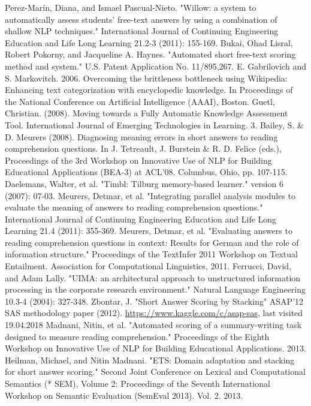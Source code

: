 \documentclass[rnd]{mas_report}
\begin{document}
\begin{thebibliography}{3}
 Perez-Marín, Diana, and Ismael Pascual-Nieto. "Willow: a system to automatically assess students’ free-text answers by using a combination of shallow NLP techniques." International Journal of Continuing Engineering Education and Life Long Learning 21.2-3 (2011): 155-169.
 Bukai, Ohad Lisral, Robert Pokorny, and Jacqueline A. Haynes. "Automated short free-text scoring method and system." U.S. Patent Application No. 11/895,267.
 E. Gabrilovich and S. Markovitch. 2006. Overcoming the brittleness bottleneck using Wikipedia: Enhancing text categorization with encyclopedic knowledge. In Proceedings of the National Conference on Artificial Intelligence (AAAI), Boston.
 Guetl, Christian. (2008). Moving towards a Fully Automatic Knowledge Assessment Tool. International Journal of Emerging Technologies in Learning. 3. 
 Bailey, S. \& D. Meurers (2008). Diagnosing meaning errors in short answers to reading comprehension questions. In J. Tetreault, J. Burstein \& R. D. Felice (eds.), Proceedings of the 3rd Workshop on Innovative Use of NLP for Building Educational Applications (BEA-3) at ACL'08. Columbus, Ohio, pp. 107-115.
 Daelemans, Walter, et al. "Timbl: Tilburg memory-based learner." version 6 (2007): 07-03.
 Meurers, Detmar, et al. "Integrating parallel analysis modules to evaluate the meaning of answers to reading comprehension questions." International Journal of Continuing Engineering Education and Life Long Learning 21.4 (2011): 355-369.
 Meurers, Detmar, et al. "Evaluating answers to reading comprehension questions in context: Results for German and the role of information structure." Proceedings of the TextInfer 2011 Workshop on Textual Entailment. Association for Computational Linguistics, 2011.
 Ferrucci, David, and Adam Lally. "UIMA: an architectural approach to unstructured information processing in the corporate research environment." Natural Language Engineering 10.3-4 (2004): 327-348.
 Zbontar, J. "Short Answer Scoring by Stacking" ASAP'12 SAS methodology paper (2012).
 \url{https://www.kaggle.com/c/asap-sas}, last visited 19.04.2018
 Madnani, Nitin, et al. "Automated scoring of a summary-writing task designed to measure reading comprehension." Proceedings of the Eighth Workshop on Innovative Use of NLP for Building Educational Applications. 2013.
 Heilman, Michael, and Nitin Madnani. "ETS: Domain adaptation and stacking for short answer scoring." Second Joint Conference on Lexical and Computational Semantics (* SEM), Volume 2: Proceedings of the Seventh International Workshop on Semantic Evaluation (SemEval 2013). Vol. 2. 2013.

\end{thebibliography}
\end{document}
